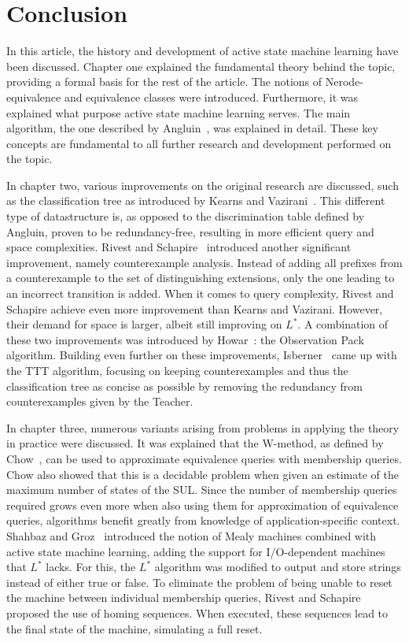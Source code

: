 \documentclass[multi,crop=false,class=article]{standalone}
\begin{document}
\section*{Conclusion}
\label{sec:conclusion}
In this article, the history and development of active state machine learning
have been discussed. Chapter one explained the fundamental theory behind the
topic, providing a formal basis for the rest of the article. The notions of
Nerode-equivalence and equivalence classes were introduced. Furthermore, it was
explained what purpose active state machine learning serves. The main algorithm,
the one described by Angluin~\cite{Angluin1987}, was explained in detail. These
key concepts are fundamental to all further research and development performed
on the topic.


In chapter two, various improvements on the original research are discussed,
such as the classification tree as introduced by Kearns and Vazirani~\cite{Kearns1994}.
This different type of datastructure is, as opposed to the discrimination table
defined by Angluin, proven to be redundancy-free, resulting in more efficient
query and space complexities. Rivest and Schapire~\cite{Rivest1993} introduced
another significant improvement, namely counterexample analysis. Instead of
adding all prefixes from a counterexample to the set of distinguishing
extensions, only the one leading to an incorrect transition is added. When it
comes to query complexity, Rivest and Schapire achieve even more improvement
than Kearns and Vazirani. However, their demand for space is larger, albeit
still improving on $L^*$. A combination of these two improvements was introduced
by Howar~\cite{Howar2012a,Isberner2015a}: the Observation Pack algorithm.
Building even further on these improvements, Isberner~\cite{Isberner2014b} came
up with the TTT algorithm, focusing on keeping counterexamples and thus the
classification tree as concise as possible by removing the redundancy from
counterexamples given by the Teacher.


In chapter three, numerous variants arising from problems in applying
the theory in practice were discussed. It was explained that the W-method,
as defined by Chow~\cite{deRuiter2015,Chow1978}, can be used to approximate equivalence
queries with membership queries. Chow also showed that this is a decidable problem
when given an estimate of the maximum number of states of the SUL.
Since the number of membership queries required grows even more when also using
them for approximation of equivalence queries, algorithms benefit greatly from
knowledge of application-specific context.
Shahbaz and Groz~\cite{Shahbaz2009}
introduced the notion of Mealy machines combined with active state machine
learning, adding the support for I/O-dependent machines that $L^*$ lacks. For
this, the $L^*$ algorithm was modified to output and store strings instead of
either true or false. To eliminate the problem of being unable to reset the
machine between individual membership queries, Rivest and Schapire~\cite{Rivest1993}
proposed the use of homing sequences. When executed, these sequences lead to the
final state of the machine, simulating a full reset.
\end{document}
